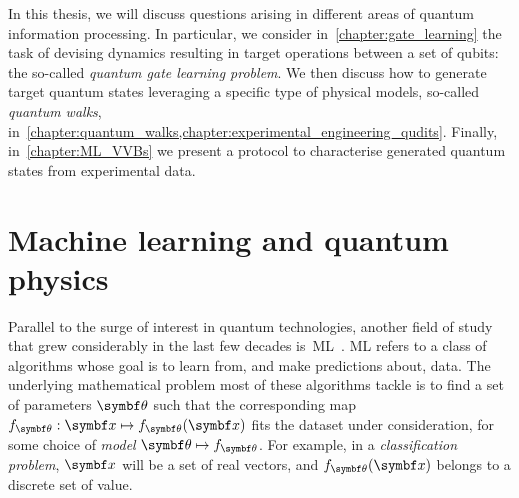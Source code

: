 In this thesis, we will discuss questions arising in different areas of quantum information processing.
In particular, we consider in~\cref{chapter:gate_learning} the task of devising dynamics resulting in target operations between a set of qubits: the so-called \emph{quantum gate learning problem}.
We then discuss how to generate target quantum states leveraging a specific type of physical models, so-called \emph{quantum walks}, in~\cref{chapter:quantum_walks,chapter:experimental_engineering_qudits}.
Finally, in~\cref{chapter:ML_VVBs} we present a protocol to characterise generated quantum states from experimental data.

\section{Machine learning and quantum physics}
\label{sec:intro:ML}

Parallel to the surge of interest in quantum technologies, another field of study that grew considerably in the last few decades is~\ac{ML}~\cite{friedman2001elements,you2011atomic,bishop2006pattern,abu2012learning,murphy2012machine,mehta2019highbias}.
\ac{ML} refers to a class of algorithms whose goal is to learn from, and make predictions about, data.
The underlying mathematical problem most of these algorithms tackle is to find a set of parameters $\bstheta$ such that the corresponding map $f_\bstheta:\bs x\mapsto f_\bstheta(\bs x)$ fits the dataset under consideration, for some choice of \emph{model} $\bstheta\mapsto f_\bstheta$.
For example, in a \emph{classification problem}, $\bs x$ will be a set of real vectors, and $f_\bstheta(\bs x)$ belongs to a discrete set of value.


